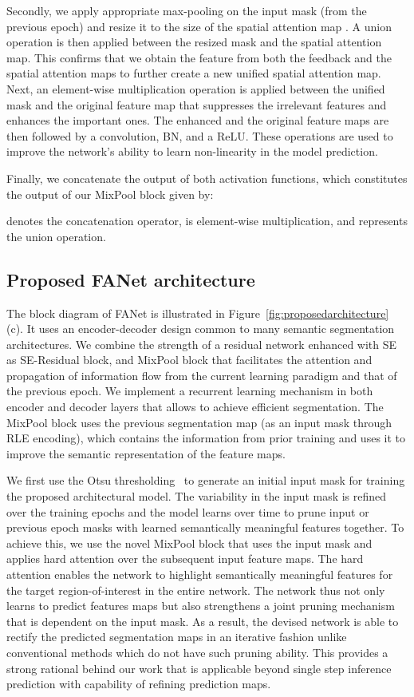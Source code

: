 \documentclass[journal]{IEEEtran}
\begin{document}
Secondly, we apply appropriate max-pooling on the input mask (from the previous epoch) and resize it to the size of the spatial attention map  . A union operation is then applied between the resized mask and the spatial attention map. This confirms that we obtain the feature from both the feedback and the spatial attention maps to further create a new unified spatial attention map.
Next, an element-wise multiplication operation is applied between the unified mask and the original feature map that suppresses the irrelevant features and enhances the important ones. The enhanced and the original feature maps are then followed by a  convolution, \ac{BN}, and a \ac{ReLU}. These operations are used to improve the network’s ability to learn non-linearity in the model prediction.

Finally, we concatenate the output of both activation functions, which constitutes the output of our MixPool block given by:

  denotes the concatenation operator,  is element-wise multiplication, and  represents the union operation.

\subsection{Proposed FANet architecture}
\label{Proposedarchitecture}
The block diagram of FANet is illustrated in Figure~\ref{fig:proposedarchitecture} (c). It uses an encoder-decoder design common to many semantic segmentation architectures. We combine the strength of a residual network enhanced with \ac{SE} as SE-Residual block, and MixPool block that facilitates the attention and propagation of information flow from the current learning paradigm and that of the previous epoch. We implement a recurrent learning mechanism in both encoder and decoder layers that allows to achieve efficient segmentation. The MixPool block uses the previous segmentation map (as an input mask through RLE encoding), which contains the information from prior training and uses it to improve the semantic representation of the feature maps.

We first use the Otsu thresholding~\cite{otsu1979threshold} to generate an initial input mask for training the proposed architectural model. The variability in the input mask is refined over the training epochs and the model learns over time to prune input or previous epoch masks with learned semantically meaningful features together. To achieve this, we use the novel MixPool block that uses the input mask and applies hard attention over the subsequent input feature maps. The hard attention enables the network to highlight semantically meaningful features for the target region-of-interest in the entire network. The network thus not only learns to predict features maps but also strengthens a joint pruning mechanism that is dependent on the input mask. As a result, the devised network is able to rectify the predicted segmentation maps in an iterative fashion unlike conventional methods which do not have such pruning ability. This provides a strong rational behind our work that is applicable beyond single step inference prediction with capability of refining prediction maps.
\end{document}
